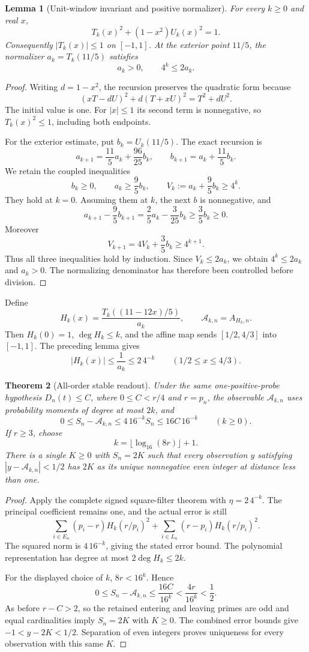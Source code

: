 \documentclass[11pt]{article}
\newtheorem{theorem}{Theorem}[section]
\newtheorem{lemma}[theorem]{Lemma}
\theoremstyle{definition}
\begin{document}
\begin{lemma}[Unit-window invariant and positive normalizer]
For every $k\ge0$ and real $x$,
\[
 T_k(x)^2+(1-x^2)U_k(x)^2=1.
\]
Consequently $|T_k(x)|\le1$ on $[-1,1]$.
At the exterior point $11/5$, the normalizer
$a_k=T_k(11/5)$ satisfies
\[
 a_k>0,\qquad 4^k\le2a_k.
\]
\end{lemma}
\begin{proof}
Writing $d=1-x^2$, the recursion preserves the quadratic form because
\[
 (xT-dU)^2+d(T+xU)^2=T^2+dU^2.
\]
The initial value is one. For $|x|\le1$ its second term is
nonnegative, so $T_k(x)^2\le1$, including both endpoints.

For the exterior estimate, put $b_k=U_k(11/5)$. The exact recursion is
\[
 a_{k+1}=\frac{11}{5}a_k+\frac{96}{25}b_k,\qquad
 b_{k+1}=a_k+\frac{11}{5}b_k.
\]
We retain the coupled inequalities
\[
 b_k\ge0,\qquad a_k\ge\frac95b_k,\qquad
 V_k:=a_k+\frac95b_k\ge4^k.
\]
They hold at $k=0$. Assuming them at $k$, the next $b$ is nonnegative,
and
\[
 a_{k+1}-\frac95b_{k+1}
 =\frac25a_k-\frac3{25}b_k
 \ge\frac35b_k\ge0.
\]
Moreover
\[
 V_{k+1}=4V_k+\frac35b_k\ge4^{k+1}.
\]
Thus all three inequalities hold by induction. Since $V_k\le2a_k$,
we obtain $4^k\le2a_k$ and $a_k>0$.
The normalizing denominator has therefore been controlled before division.
\end{proof}

Define
\[
 H_k(x)=\frac{T_k((11-12x)/5)}{a_k},\qquad
 \mathcal A_{k,n}=A_{H_k,n}.
\]
Then $H_k(0)=1$, $\deg H_k\le k$, and the affine map sends
$[1/2,4/3]$ into $[-1,1]$. The preceding lemma gives
\[
 |H_k(x)|\le\frac1{a_k}\le2\,4^{-k}
 \qquad(1/2\le x\le4/3).
\]

\begin{theorem}[All-order stable readout]
Under the same one-positive-probe hypothesis $D_n(t)\le C$,
where $0\le C<r/4$ and $r=p_n$, the observable $\mathcal A_{k,n}$
uses probability moments of degree at most $2k$, and
\[
 0\le S_n-\mathcal A_{k,n}
    \le4\,16^{-k}S_n\le16C\,16^{-k}
 \qquad(k\ge0).
\]
If $r\ge3$, choose
\[
 k=\lfloor\log_{16}(8r)\rfloor+1.
\]
There is a single $K\ge0$ with $S_n=2K$ such that every observation
$y$ satisfying $|y-\mathcal A_{k,n}|<1/2$ has $2K$ as its unique
nonnegative even integer at distance less than one.
\end{theorem}
\begin{proof}
Apply the complete signed square-filter theorem with
$\eta=2\,4^{-k}$. The principal coefficient remains one, and the
actual error is still
\[
 \sum_{i\in E_n}(p_i-r)H_k(r/p_i)^2
 +\sum_{i\in L_n}(r-p_i)H_k(r/p_i)^2.
\]
The squared norm is $4\,16^{-k}$, giving the stated error bound.
The polynomial representation has degree at most $2\deg H_k\le2k$.

For the displayed choice of $k$, $8r<16^k$. Hence
\[
 0\le S_n-\mathcal A_{k,n}\le\frac{16C}{16^k}
       <\frac{4r}{16^k}<\frac12.
\]
As before $r-C>2$, so the retained entering and leaving primes are
odd and equal cardinalities imply $S_n=2K$ with $K\ge0$.
The combined error bounds give $-1<y-2K<1/2$.
Separation of even integers proves uniqueness for every observation
with this same $K$.
\end{proof}
\end{document}
